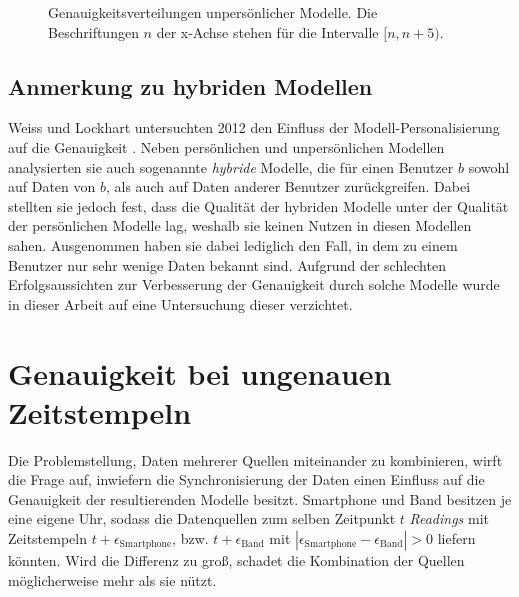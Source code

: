 \begin{figure}
\centering
{}
\caption[Genauigkeitsverteilungen unpersönlicher Modelle]{Genauigkeitsverteilungen unpersönlicher Modelle. Die Beschriftungen $n$ der x-Achse stehen für die Intervalle $[n, n+5)$. }
\label{fig:accuracy-impersonal-per-user}
\end{figure}

\subsection{Anmerkung zu hybriden Modellen}
Weiss und Lockhart untersuchten 2012 den Einfluss der Modell-Personalisierung auf die Genauigkeit \cite{Weiss2012}. Neben persönlichen und unpersönlichen Modellen analysierten sie auch sogenannte \textit{hybride} Modelle, die für einen Benutzer $b$ sowohl auf Daten von $b$, als auch auf Daten anderer Benutzer zurückgreifen. Dabei stellten sie jedoch fest, dass die Qualität der hybriden Modelle unter der Qualität der persönlichen Modelle lag, weshalb sie keinen Nutzen in diesen Modellen sahen. Ausgenommen haben sie dabei lediglich den Fall, in dem zu einem Benutzer nur sehr wenige Daten bekannt sind. Aufgrund der schlechten Erfolgsaussichten zur Verbesserung der Genauigkeit durch solche Modelle wurde in dieser Arbeit auf eine Untersuchung dieser verzichtet.


\section{Genauigkeit bei ungenauen Zeitstempeln}
Die Problemstellung, Daten mehrerer Quellen miteinander zu kombinieren, wirft die Frage auf, inwiefern die Synchronisierung der Daten einen Einfluss auf die Genauigkeit der resultierenden Modelle besitzt. Smartphone und Band besitzen je eine eigene Uhr, sodass die Datenquellen zum selben Zeitpunkt $t$ \textit{Readings} mit Zeitstempeln $t + \epsilon_\text{Smartphone}$, bzw. $t + \epsilon_\text{Band}$ mit $|\epsilon_\text{Smartphone} - \epsilon_\text{Band}| > 0$ liefern könnten. Wird die Differenz zu groß, schadet die Kombination der Quellen möglicherweise mehr als sie nützt.

